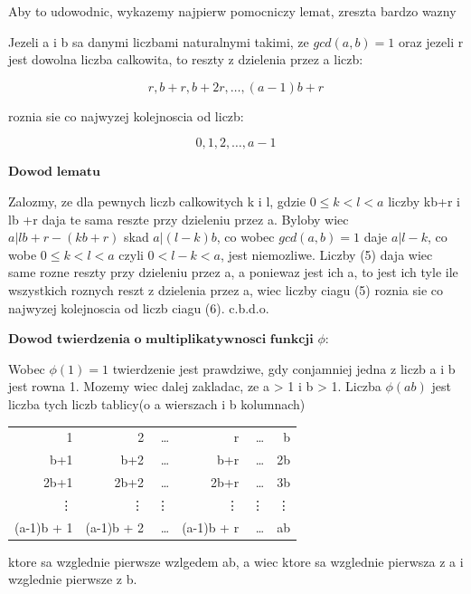 \documentclass[12]{article}
\begin{document}
Aby to udowodnic, wykazemy najpierw pomocniczy lemat, zreszta bardzo wazny

\begin{tcolorbox}[colback=white!90!green,colframe=black!35!green,title= Reszty z dzielenia przez a kolejnych liczb od r az do ab - b + r]

    Jezeli a i b sa danymi liczbami naturalnymi takimi, ze $gcd(a,b) = 1$ oraz jezeli r jest dowolna liczba calkowita, to reszty z dzielenia przez a liczb:

    \[r, b+r, b+2r, \dots, (a-1)b + r \tag{5}\]
  
 roznia sie co najwyzej kolejnoscia od liczb:

    \[ 0, 1, 2, \dots, a-1 \tag{6} \]

\end{tcolorbox}

$\textbf{Dowod lematu}$

Zalozmy, ze dla pewnych liczb calkowitych k i l, gdzie $0\leq k < l < a$ liczby kb+r i lb +r daja te sama reszte przy dzieleniu przez a. Byloby wiec $a| lb + r - (kb + r)$ skad $a|(l-k)b$, co wobec $gcd(a, b) = 1$ daje $a| l-k$, co wobe $0\leq k < l < a$ czyli $0 < l-k < a$, jest niemozliwe. Liczby (5) daja wiec same rozne reszty przy dzieleniu przez a, a poniewaz jest ich a, to jest ich tyle ile wszystkich roznych reszt z dzielenia przez a, wiec liczby ciagu (5) roznia sie co najwyzej kolejnoscia od liczb ciagu (6). c.b.d.o.

$\textbf{Dowod twierdzenia o multiplikatywnosci funkcji $\phi$:}$

Wobec $\phi(1) = 1 $ twierdzenie jest prawdziwe, gdy conjamniej jedna z liczb a i b jest rowna 1. Mozemy wiec dalej zakladac, ze a > 1 i b > 1. Liczba $\phi(ab)$ jest liczba tych liczb tablicy(o a wierszach i b kolumnach)

\begin{tabular}{|r|r|r|r|r|r|}
    \hline
    1 & 2 & \dots & r & \dots & b \\
    b+1 & b+2 & \dots & b+r & \dots & 2b \\
    2b+1 & 2b+2 & \dots & 2b+r & \dots& 3b \\
    \vdots & \vdots & \vdots & \vdots & \vdots & \vdots \\
    (a-1)b + 1 & (a-1)b + 2 & \dots &(a-1)b + r & \dots& ab \\
    \hline
\end{tabular}

ktore sa wzglednie pierwsze wzlgedem ab, a wiec ktore sa wzglednie pierwsza z a i wzglednie pierwsze z b.
\end{document}

